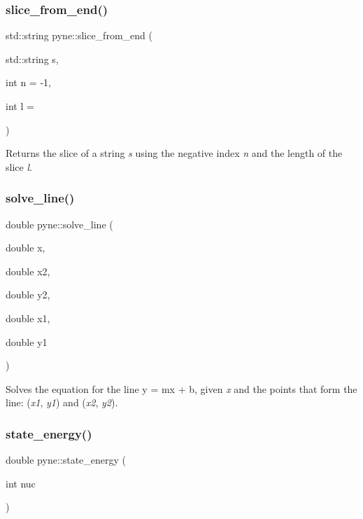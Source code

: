 \subsubsection{\texorpdfstring{slice\+\_\+from\+\_\+end()}{slice\_from\_end()}}
{\footnotesize\ttfamily std\+::string pyne\+::slice\+\_\+from\+\_\+end (\begin{DoxyParamCaption}\item[{std\+::string}]{s,  }\item[{int}]{n = {\ttfamily -\/1},  }\item[{int}]{l = {} }\end{DoxyParamCaption})}

Returns the slice of a string {\itshape s} using the negative index {\itshape n} and the length of the slice {\itshape l}. \mbox{\label{namespacepyne_a943fe41cf25ff550684aabffe5971e1e}} 
\subsubsection{\texorpdfstring{solve\+\_\+line()}{solve\_line()}}
{\footnotesize\ttfamily double pyne\+::solve\+\_\+line (\begin{DoxyParamCaption}\item[{double}]{x,  }\item[{double}]{x2,  }\item[{double}]{y2,  }\item[{double}]{x1,  }\item[{double}]{y1 }\end{DoxyParamCaption})}

Solves the equation for the line y = mx + b, given {\itshape x} and the points that form the line\+: ({\itshape x1}, {\itshape y1}) and ({\itshape x2}, {\itshape y2}). \mbox{\label{namespacepyne_ada1a23281a3a62267fbd355bd48da2e6}} 
\subsubsection{\texorpdfstring{state\+\_\+energy()}{state\_energy()}}
{\footnotesize\ttfamily double pyne\+::state\+\_\+energy (\begin{DoxyParamCaption}\item[{int}]{nuc }\end{DoxyParamCaption})}



